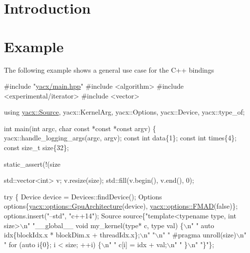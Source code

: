 \hypertarget{index_intro}{}\section{Introduction}\label{index_intro}
\hypertarget{index_example}{}\section{Example}\label{index_example}
The following example shows a general use case for the C++ bindings


\begin{DoxyCodeInclude}
\textcolor{preprocessor}{#include "\hyperlink{main_8hpp}{yacx/main.hpp}"}
\textcolor{preprocessor}{#include <algorithm>}
\textcolor{preprocessor}{#include <experimental/iterator>}
\textcolor{preprocessor}{#include <vector>}

\textcolor{keyword}{using} \hyperlink{classyacx_1_1_source}{yacx::Source}, yacx::KernelArg, yacx::Options, yacx::Device, yacx::type\_of;

\textcolor{keywordtype}{int} main(\textcolor{keywordtype}{int} argc, \textcolor{keywordtype}{char} \textcolor{keyword}{const} *\textcolor{keyword}{const} *\textcolor{keyword}{const} argv) \{
  yacx::handle\_logging\_args(argc, argv);
  \textcolor{keyword}{const} \textcolor{keywordtype}{int} data\{1\};
  \textcolor{keyword}{const} \textcolor{keywordtype}{int} times\{4\};
  \textcolor{keyword}{const} \textcolor{keywordtype}{size\_t} size\{32\};

  static\_assert(!(size %

  std::vector<int> v;
  v.resize(size);
  std::fill(v.begin(), v.end(), 0);

  \textcolor{keywordflow}{try} \{
    Device device = Devices::findDevice();
    Options options\{\hyperlink{classyacx_1_1options_1_1_gpu_architecture}{yacx::options::GpuArchitecture}(device),
                    \hyperlink{classyacx_1_1options_1_1_f_m_a_d}{yacx::options::FMAD}(\textcolor{keyword}{false})\};
    options.insert(\textcolor{stringliteral}{"--std"}, \textcolor{stringliteral}{"c++14"});
    Source source\{\textcolor{stringliteral}{"template<typename type, int size>\(\backslash\)n"}
                  \textcolor{stringliteral}{"\_\_global\_\_ void my\_kernel(type* c, type val) \{\(\backslash\)n"}
                  \textcolor{stringliteral}{"    auto idx\{blockIdx.x * blockDim.x + threadIdx.x\};\(\backslash\)n"}
                  \textcolor{stringliteral}{"\(\backslash\)n"}
                  \textcolor{stringliteral}{"    #pragma unroll(size)\(\backslash\)n"}
                  \textcolor{stringliteral}{"    for (auto i\{0\}; i < size; ++i) \{\(\backslash\)n"}
                  \textcolor{stringliteral}{"        c[i] = idx + val;\(\backslash\)n"}
                  \textcolor{stringliteral}{"    \}\(\backslash\)n"}
                  \textcolor{stringliteral}{"\}"}\};


\end{DoxyCodeInclude}
